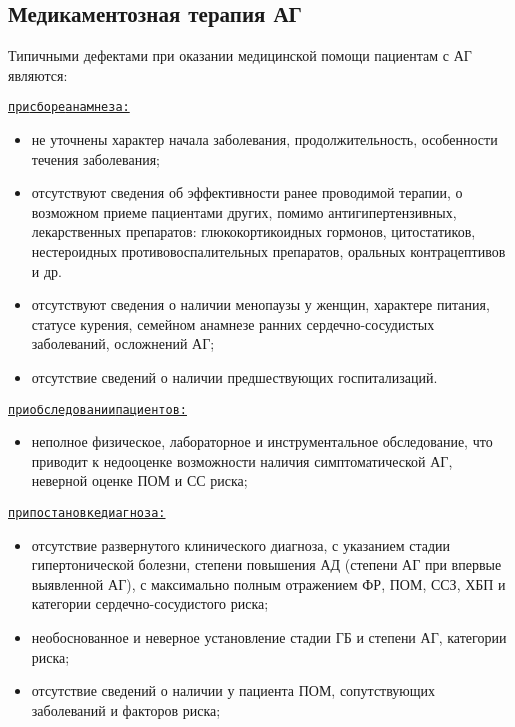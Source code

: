 \documentclass{article}%
\begin{document}
\subsection{Медикаментозная терапия АГ}%
\label{subsec:}%
Типичными дефектами при оказании медицинской помощи пациентам с АГ являются:%
\begin{alltt}
\underline{при сборе анамнеза:}
\end{alltt}%
\begin{itemize}%
\item%
не уточнены характер начала заболевания, продолжительность, особенности течения заболевания;%
\item%
отсутствуют сведения об эффективности ранее проводимой терапии, о возможном приеме пациентами других, помимо антигипертензивных, лекарственных препаратов: глюкокортикоидных гормонов, цитостатиков, нестероидных противовоспалительных препаратов, оральных контрацептивов и др.%
\item%
отсутствуют сведения о наличии менопаузы у женщин, характере питания, статусе курения, семейном анамнезе ранних сердечно{-}сосудистых заболеваний, осложнений АГ;%
\item%
отсутствие сведений о наличии предшествующих госпитализаций.%
\end{itemize}%
\newline%
\begin{alltt}
\underline{при обследовании пациентов:}
\end{alltt}%
\begin{itemize}%
\item%
неполное физическое, лабораторное и инструментальное обследование, что приводит к недооценке возможности наличия симптоматической АГ, неверной оценке ПОМ и СС риска;%
\end{itemize}%
\newline%
\begin{alltt}
\underline{при постановке диагноза:}
\end{alltt}%
\begin{itemize}%
\item%
отсутствие развернутого клинического диагноза, с указанием стадии гипертонической болезни, степени повышения АД (степени АГ при впервые выявленной АГ), с максимально полным отражением ФР, ПОМ, ССЗ, ХБП и категории сердечно{-}сосудистого риска;%
\item%
необоснованное и неверное установление стадии ГБ и степени АГ, категории риска;%
\item%
отсутствие сведений о наличии у пациента ПОМ, сопутствующих заболеваний и факторов риска;%
\end{itemize}%
\end{document}
